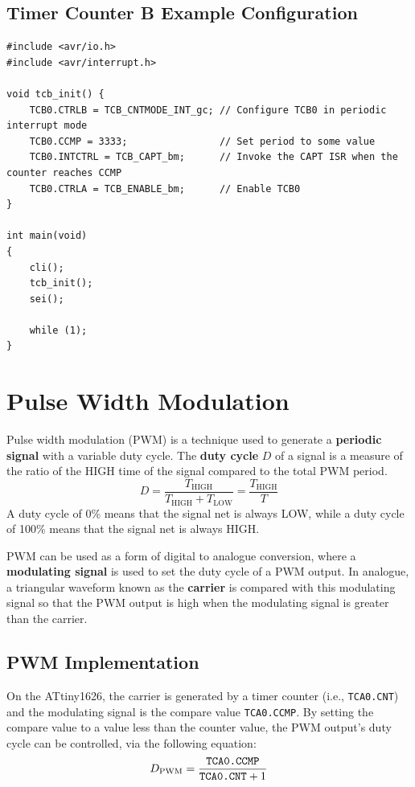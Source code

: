 \documentclass[a4paper]{report}
\begin{document}
\subsection{Timer Counter B Example Configuration}
\begin{verbatim}
#include <avr/io.h>
#include <avr/interrupt.h>

void tcb_init() {
    TCB0.CTRLB = TCB_CNTMODE_INT_gc; // Configure TCB0 in periodic interrupt mode
    TCB0.CCMP = 3333;                // Set period to some value
    TCB0.INTCTRL = TCB_CAPT_bm;      // Invoke the CAPT ISR when the counter reaches CCMP
    TCB0.CTRLA = TCB_ENABLE_bm;      // Enable TCB0
}

int main(void)
{
    cli();
    tcb_init();
    sei();

    while (1);
}
\end{verbatim}
\section{Pulse Width Modulation}
Pulse width modulation (PWM) is a technique used to generate a \textbf{periodic signal}
with a variable duty cycle. The \textbf{duty cycle} \(D\) of a signal
is a measure of the ratio of the HIGH time of the signal compared to the total PWM period.
\begin{equation*}
    D = \frac{T_\mathrm{HIGH}}{T_\mathrm{HIGH} + T_\mathrm{LOW}} = \frac{T_\mathrm{HIGH}}{T}
\end{equation*}
A duty cycle of 0\% means that the signal net is always LOW, while a duty cycle of 100\%
means that the signal net is always HIGH\@.

PWM can be used as a form of digital to analogue conversion, where a \textbf{modulating signal}
is used to set the duty cycle of a PWM output. In analogue, a triangular waveform known as the \textbf{carrier}
is compared with this modulating signal so that the PWM output is high when the modulating signal is greater than the carrier.
\subsection{PWM Implementation}
On the ATtiny1626, the carrier is generated by a timer counter (i.e., \texttt{TCA0.CNT}) and the modulating signal
is the compare value \texttt{TCA0.CCMP}. By setting the compare value to a value less than the counter value,
the PWM output's duty cycle can be controlled, via the following equation:
\begin{equation*}
    D_\mathrm{PWM} = \frac{\text{\texttt{TCA0.CCMP}}}{\text{\texttt{TCA0.CNT}} + 1}
\end{equation*}
\end{document}
